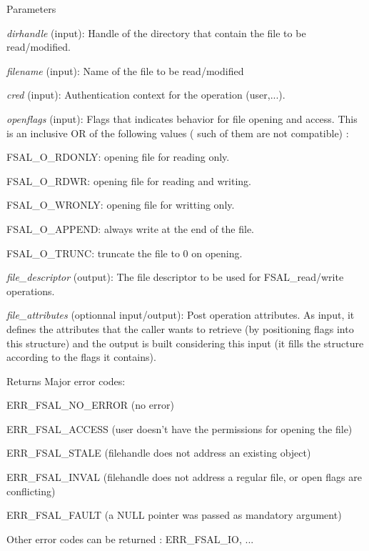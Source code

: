 \begin{DoxyParams}{Parameters}
\item[{\em dirhandle}](input): Handle of the directory that contain the file to be read/modified. \item[{\em filename}](input): Name of the file to be read/modified \item[{\em cred}](input): Authentication context for the operation (user,...). \item[{\em openflags}](input): Flags that indicates behavior for file opening and access. This is an inclusive OR of the following values ( such of them are not compatible) :
\begin{DoxyItemize}
\item FSAL\_\-O\_\-RDONLY: opening file for reading only.
\item FSAL\_\-O\_\-RDWR: opening file for reading and writing.
\item FSAL\_\-O\_\-WRONLY: opening file for writting only.
\item FSAL\_\-O\_\-APPEND: always write at the end of the file.
\item FSAL\_\-O\_\-TRUNC: truncate the file to 0 on opening. 
\end{DoxyItemize}\item[{\em file\_\-descriptor}](output): The file descriptor to be used for FSAL\_\-read/write operations. \item[{\em file\_\-attributes}](optionnal input/output): Post operation attributes. As input, it defines the attributes that the caller wants to retrieve (by positioning flags into this structure) and the output is built considering this input (it fills the structure according to the flags it contains).\end{DoxyParams}
\begin{DoxyReturn}{Returns}
Major error codes:
\begin{DoxyItemize}
\item ERR\_\-FSAL\_\-NO\_\-ERROR (no error)
\item ERR\_\-FSAL\_\-ACCESS (user doesn't have the permissions for opening the file)
\item ERR\_\-FSAL\_\-STALE (filehandle does not address an existing object)
\item ERR\_\-FSAL\_\-INVAL (filehandle does not address a regular file, or open flags are conflicting)
\item ERR\_\-FSAL\_\-FAULT (a NULL pointer was passed as mandatory argument)
\item Other error codes can be returned : ERR\_\-FSAL\_\-IO, ... 
\end{DoxyItemize}
\end{DoxyReturn}


